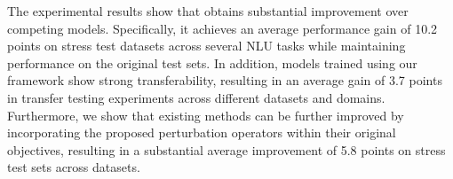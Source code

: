 The experimental results show that \OursName obtains substantial improvement over competing models. Specifically, it achieves an average performance gain of 10.2 points on stress test datasets across several NLU tasks while maintaining performance on the original test sets. In addition, models trained using our framework show strong transferability, resulting in an average gain of 3.7 points in transfer testing experiments across different datasets and domains. 
Furthermore, 
we show that existing methods can be further improved by incorporating the proposed perturbation operators within their original objectives, resulting in a substantial average improvement of 5.8 points on stress test sets across datasets. 


